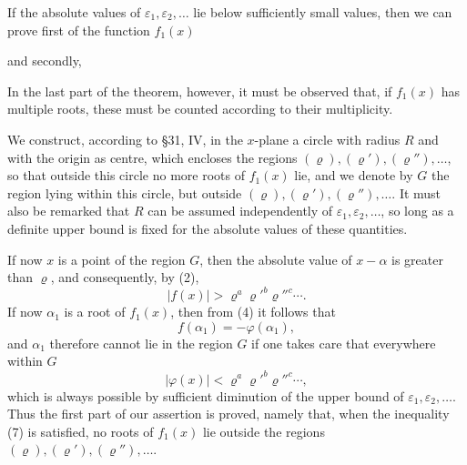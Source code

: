 
If the absolute values of $\varepsilon_1,\varepsilon_2,
\ldots$ lie below sufficiently small values, then we can prove first of the function $f_1(x)$
\begin{center}
\end{center}
and secondly,
\begin{center}
\end{center}
In the last part of the theorem, however, it must be observed that, if $f_1(x)$ has multiple roots, these must be counted according to their multiplicity.

We construct, according to \S 31, IV, in the $x$-plane a circle with radius $R$ and with the origin as centre, which encloses the regions $(\varrho),(\varrho'),(\varrho''),\ldots$, so that outside this circle no more roots of $f_1(x)$ lie, and we denote by $G$ the region lying within this circle, but outside $(\varrho),(\varrho'),(\varrho''),\ldots$. It must also be remarked that $R$ can be assumed independently of $\varepsilon_1,\varepsilon_2,\ldots$, so long as a definite upper bound is fixed for the absolute values of these quantities.


If now $x$ is a point of the region $G$, then the absolute value of $x-\alpha$ is greater than $\varrho$, and consequently, by (2),
\begin{equation}
 |f(x)|>\varrho^a\varrho'^b\varrho''^c\cdots .
\tag{5}
\end{equation}
If now $\alpha_1$ is a root of $f_1(x)$, then from (4) it follows that
\begin{equation}
 f(\alpha_1)=-\varphi(\alpha_1),
\tag{6}
\end{equation}
and $\alpha_1$ therefore cannot lie in the region $G$ if one takes care that everywhere within $G$
\begin{equation}
 |\varphi(x)|<\varrho^a\varrho'^b\varrho''^c\cdots,
\tag{7}
\end{equation}
which is always possible by sufficient diminution of the upper bound of $\varepsilon_1,\varepsilon_2,
\ldots$. Thus the first part of our assertion is proved, namely that, when the inequality (7) is satisfied, no roots of $f_1(x)$ lie outside the regions $(\varrho),(\varrho'),(\varrho''),\ldots$.
